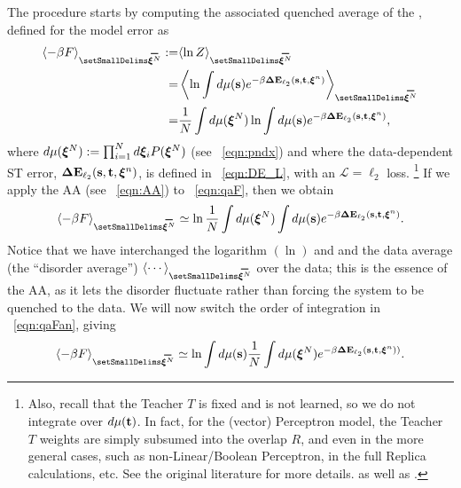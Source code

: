 
The procedure starts by computing the associated quenched average of
the \FreeEnergy, defined for the model error as
\begin{align}
\nonumber
\langle-\beta F \rangle_{\AVGNDXI} 
   :=& \langle \ln Z \rangle_{\AVGNDXI} \\ 
\nonumber
   =&\left\langle \ln \int d\mu(\SVEC)e^{-\beta\DETOPSTLL} \right\rangle_{\AVGNDXI}  \\ 
\label{eqn:qaF}
   =& \frac{1}{N}\int d\mu(\NDXI)\ln\int d\mu(\SVEC)e^{-\beta\DETOPSTLL}   ,
\end{align}
where $d\mu(\boldsymbol{\xi}^{N}):=\prod_{i=1}^{N}d\boldsymbol{\xi}_{i} P(\boldsymbol{\xi}^{N})$ (see \EQN~\ref{eqn:pndx}) and
where the data-dependent ST error, $\mathbf{\Delta {E}}_{\ell_2}({\mathbf{s}},{\mathbf{t}}, \boldsymbol{\xi}^{n})$, is defined in \EQN~\ref{eqn:DE_L},
with an $\mathcal{L}=\ell_2$ loss.  \footnote{Also, recall that the Teacher $T$ is fixed and is not learned, so we do not integrate over $d\mu({\mathbf{t}})$. In fact, for the (vector) Perceptron model, the Teacher $T$ weights are simply subsumed into the overlap $R$, and even in the more general cases, such as non-Linear/Boolean Perceptron, in the full Replica calculations, etc.  See the original literature for more details. \cite{Opper01,SST92,EngelAndVanDenBroeck} as well as \cite{MM17_TR}.}
%
If we apply the AA (see \EQN~\ref{eqn:AA}) to \EQN~\ref{eqn:qaF}, then we obtain
\begin{align}
\label{eqn:qaFan}
\langle-\beta F \rangle_{\AVGNDXI} \simeq 
   \ln \frac{1}{N}\int d\mu(\NDXI) \int d\mu(\SVEC) e^{-\beta\DETOPSTLL}   .
\end{align}
%
Notice that we have interchanged the logarithm $(\ln)$ and
and the data average (the “disorder average”) 
$\langle\cdots\rangle_{\AVGNDXI}$ over the data; 
this is the essence of the AA, as it lets the disorder fluctuate rather than forcing the system to be quenched to the data.
%
We will now switch the order of integration in \EQN~\ref{eqn:qaFan}, giving
\begin{align}
\label{eqn:qaFan3}
\langle-\beta F \rangle_{\AVGNDXI} \simeq 
   \ln \int d\mu(\SVEC)\frac{1}{N}\int d\mu(\NDXI)e^{-\beta\DETOPSTLL)}   .
\end{align}


